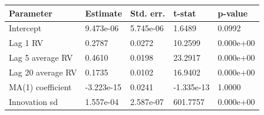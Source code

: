\begin{tabular}{lllll}
\toprule
Parameter & Estimate & Std. err. & t-stat & p-value \\
\midrule
Intercept & 9.473e-06 & 5.745e-06 & 1.6489 & 0.0992 \\
Lag 1 RV & 0.2787 & 0.0272 & 10.2599 & 0.000e+00 \\
Lag 5 average RV & 0.4610 & 0.0198 & 23.2917 & 0.000e+00 \\
Lag 20 average RV & 0.1735 & 0.0102 & 16.9402 & 0.000e+00 \\
MA(1) coefficient & -3.223e-15 & 0.0241 & -1.335e-13 & 1.0000 \\
Innovation sd & 1.557e-04 & 2.587e-07 & 601.7757 & 0.000e+00 \\
\bottomrule
\end{tabular}
